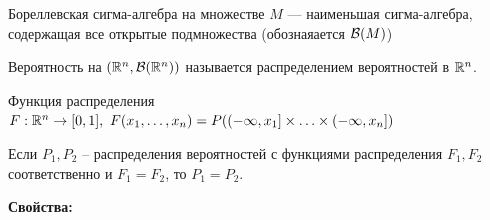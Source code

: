 \begin{definition}
Бореллевская сигма-алгебра на множестве $M$ --- наименьшая сигма-алгебра, содержащая все открытые подмножества (обознаяается $\mathcal{B}(M)$)
\end{definition}

\begin{definition}
Вероятность на $(\mathbb{R}^n, \mathcal{B}(\mathbb{R}^n))$ называется распределением вероятностей в $\mathbb{R}^n$.
\end{definition}

\begin{definition}
Функция распределения $F: \mathbb{R}^n \to [0, 1], \ F(x_1, \ldots, x_n) = P((-\infty, x_1] \times \ldots \times (-\infty, x_n])$
\end{definition}

\begin{statement}
Если $P_1, P_2$ -- распределения вероятностей с функциями распределения $F_1, F_2$ соответственно и $F_1 = F_2$, то $P_1 = P_2$.
\end{statement}

\textbf{Свойства:}

